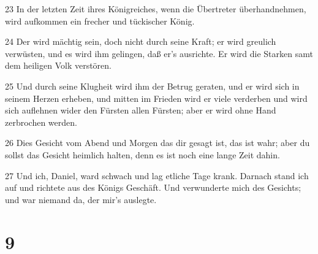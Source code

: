 \par 23 In der letzten Zeit ihres Königreiches, wenn die Übertreter überhandnehmen, wird aufkommen ein frecher und tückischer König.
\par 24 Der wird mächtig sein, doch nicht durch seine Kraft; er wird greulich verwüsten, und es wird ihm gelingen, daß er's ausrichte. Er wird die Starken samt dem heiligen Volk verstören.
\par 25 Und durch seine Klugheit wird ihm der Betrug geraten, und er wird sich in seinem Herzen erheben, und mitten im Frieden wird er viele verderben und wird sich auflehnen wider den Fürsten allen Fürsten; aber er wird ohne Hand zerbrochen werden.
\par 26 Dies Gesicht vom Abend und Morgen das dir gesagt ist, das ist wahr; aber du sollst das Gesicht heimlich halten, denn es ist noch eine lange Zeit dahin.
\par 27 Und ich, Daniel, ward schwach und lag etliche Tage krank. Darnach stand ich auf und richtete aus des Königs Geschäft. Und verwunderte mich des Gesichts; und war niemand da, der mir's auslegte.

\chapter{9}

